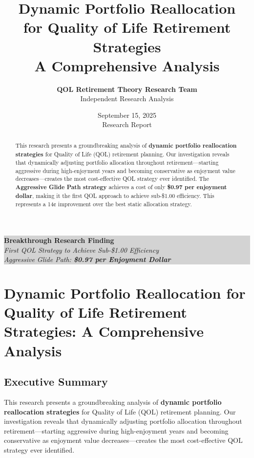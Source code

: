 \documentclass[11pt,letterpaper]{article}
\title{
    \vspace{-1cm}
    \Huge\textbf{\color{primary}Dynamic Portfolio Reallocation}\\
    \vspace{0.4cm}
    \LARGE\textbf{\color{secondary}for Quality of Life Retirement Strategies}\\
    \vspace{0.3cm}
    \Large\textbf{\color{accent}A Comprehensive Analysis}
}
\author{
    \large\textbf{QOL Retirement Theory Research Team}\\
    \normalsize Independent Research Analysis
}
\date{
    \large September 15, 2025\\
    \vspace{0.2cm}
    \normalsize Research Report
}
\begin{document}
\maketitle
\thispagestyle{empty}

\vfill
\begin{center}
\large
\colorbox{lightgray}{\parbox{0.8\textwidth}{\centering
\textbf{Breakthrough Research Finding}\\
\vspace{0.3cm}
\textit{First QOL Strategy to Achieve Sub-\$1.00 Efficiency}\\
\textit{Aggressive Glide Path: \textbf{\$0.97 per Enjoyment Dollar}}
}}
\end{center}
\vfill

\newpage

\begin{abstract}
\noindent This research presents a groundbreaking analysis of \textbf{dynamic portfolio reallocation strategies} for Quality of Life (QOL) retirement planning. Our investigation reveals that dynamically adjusting portfolio allocation throughout retirement—starting aggressive during high-enjoyment years and becoming conservative as enjoyment value decreases—creates the most cost-effective QOL strategy ever identified. The \textbf{Aggressive Glide Path strategy} achieves a cost of only \textbf{\$0.97 per enjoyment dollar}, making it the first QOL approach to achieve sub-\$1.00 efficiency. This represents a 14¢ improvement over the best static allocation strategy.
\end{abstract}

\tableofcontents
\newpage

\section{Dynamic Portfolio Reallocation for Quality of Life Retirement Strategies: A Comprehensive Analysis}





\subsection{Executive Summary}


This research presents a groundbreaking analysis of \textbf{dynamic portfolio reallocation strategies} for Quality of Life (QOL) retirement planning. Our investigation reveals that dynamically adjusting portfolio allocation throughout retirement—starting aggressive during high-enjoyment years and becoming conservative as enjoyment value decreases—creates the most cost-effective QOL strategy ever identified.
\end{document}

